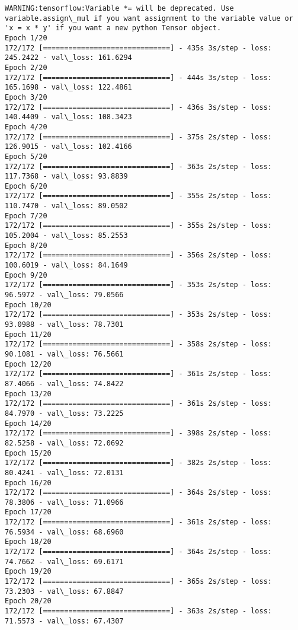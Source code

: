 \documentclass[11pt]{article}
\begin{document}
    \begin{Verbatim}[commandchars=\\\{\}]
WARNING:tensorflow:Variable *= will be deprecated. Use variable.assign\_mul if you want assignment to the variable value or 'x = x * y' if you want a new python Tensor object.
Epoch 1/20
172/172 [==============================] - 435s 3s/step - loss: 245.2422 - val\_loss: 161.6294
Epoch 2/20
172/172 [==============================] - 444s 3s/step - loss: 165.1698 - val\_loss: 122.4861
Epoch 3/20
172/172 [==============================] - 436s 3s/step - loss: 140.4409 - val\_loss: 108.3423
Epoch 4/20
172/172 [==============================] - 375s 2s/step - loss: 126.9015 - val\_loss: 102.4166
Epoch 5/20
172/172 [==============================] - 363s 2s/step - loss: 117.7368 - val\_loss: 93.8839
Epoch 6/20
172/172 [==============================] - 355s 2s/step - loss: 110.7470 - val\_loss: 89.0502
Epoch 7/20
172/172 [==============================] - 355s 2s/step - loss: 105.2004 - val\_loss: 85.2553
Epoch 8/20
172/172 [==============================] - 356s 2s/step - loss: 100.6019 - val\_loss: 84.1649
Epoch 9/20
172/172 [==============================] - 353s 2s/step - loss: 96.5972 - val\_loss: 79.0566
Epoch 10/20
172/172 [==============================] - 353s 2s/step - loss: 93.0988 - val\_loss: 78.7301
Epoch 11/20
172/172 [==============================] - 358s 2s/step - loss: 90.1081 - val\_loss: 76.5661
Epoch 12/20
172/172 [==============================] - 361s 2s/step - loss: 87.4066 - val\_loss: 74.8422
Epoch 13/20
172/172 [==============================] - 361s 2s/step - loss: 84.7970 - val\_loss: 73.2225
Epoch 14/20
172/172 [==============================] - 398s 2s/step - loss: 82.5258 - val\_loss: 72.0692
Epoch 15/20
172/172 [==============================] - 382s 2s/step - loss: 80.4241 - val\_loss: 72.0131
Epoch 16/20
172/172 [==============================] - 364s 2s/step - loss: 78.3806 - val\_loss: 71.0966
Epoch 17/20
172/172 [==============================] - 361s 2s/step - loss: 76.5934 - val\_loss: 68.6960
Epoch 18/20
172/172 [==============================] - 364s 2s/step - loss: 74.7662 - val\_loss: 69.6171
Epoch 19/20
172/172 [==============================] - 365s 2s/step - loss: 73.2303 - val\_loss: 67.8847
Epoch 20/20
172/172 [==============================] - 363s 2s/step - loss: 71.5573 - val\_loss: 67.4307

    \end{Verbatim}
\end{document}
